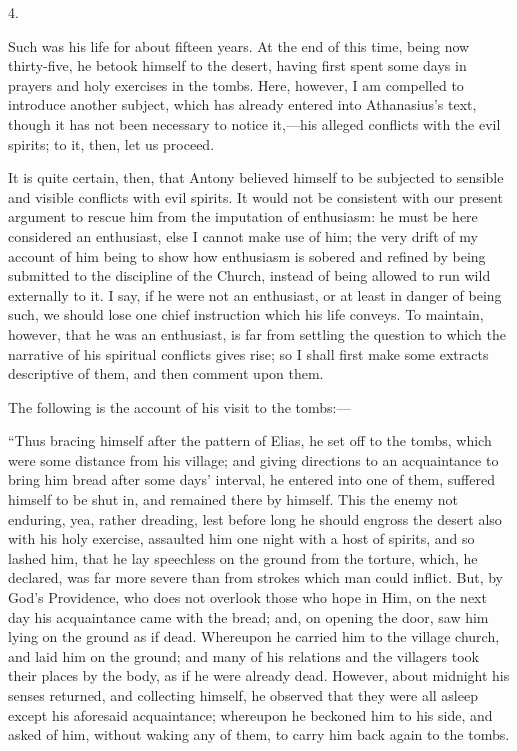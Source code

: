 4.

Such was his life for about fifteen years. At the end of this time,
being now thirty-five, he betook himself to the desert, having first
spent some days in prayers and holy exercises in the tombs. Here,
however, I am compelled to introduce another subject, which has
already entered into Athanasius's text, though it has not been
necessary to notice it,—his alleged conflicts with the evil spirits;
to it, then, let us proceed.

It is quite certain, then, that Antony believed himself to be
subjected to sensible and visible conflicts with evil spirits. It
would not be consistent with our present argument to rescue him from
the imputation of enthusiasm: he must be here considered an
enthusiast, else I cannot make use of him; the very drift of my
account of him being to show how enthusiasm is sobered and refined by
being submitted to the discipline of the Church, instead of being
allowed to run wild externally to it. I say, if he were not an
enthusiast, or at least in danger of being such, we should lose one
chief instruction which his life conveys. To maintain, however, that
he was an enthusiast, is far from settling the question to which the
narrative of his spiritual conflicts gives rise; so I shall first make
some extracts descriptive of them, and then comment upon them.

The following is the account of his visit to the tombs:—

``Thus bracing himself after the pattern of
Elias, he set off to the tombs, which were some distance from his
village; and giving directions to an acquaintance to bring him bread
after some days' interval, he entered into one of them, suffered
himself to be shut in, and remained there by himself. This the enemy
not enduring, yea, rather dreading, lest before long he should engross
the desert also with his holy exercise, assaulted him one night with a
host of spirits, and so lashed him, that he lay speechless on the
ground from the torture, which, he declared, was far more severe than
from strokes which man could inflict. But, by God's Providence, who
does not overlook those who hope in Him, on the next day his
acquaintance came with the bread; and, on opening the door, saw him
lying on the ground as if dead. Whereupon he carried him to the
village church, and laid him on the ground; and many of his relations
and the villagers took their places by the body, as if he were already
dead. However, about midnight his senses returned, and collecting
himself, he observed that they were all asleep except his aforesaid
acquaintance; whereupon he beckoned him to his side, and asked of him,
without waking any of them, to carry him back again to the tombs.

